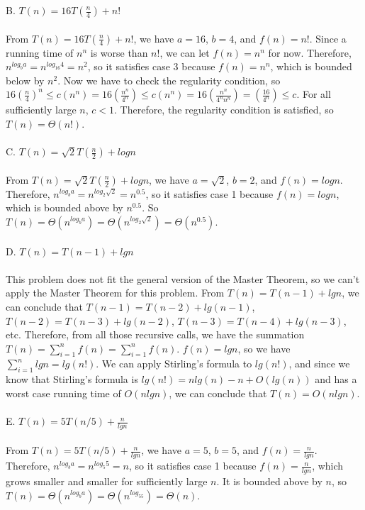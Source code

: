 \documentclass{article}
\begin{document}
\noindent B. $T(n) = 16 T(\frac{n}{4}) + n!$\\\\
From $T(n) = 16 T(\frac{n}{4}) + n!$, we have $a=16$, $b=4$, and $f(n)=n!$. Since a running time of $n^n$ is worse than $n!$, we can let $f(n)=n^n$ for now. Therefore, $n^{log_ba} = n^{log_{16}{4}} = n^2$, so it satisfies case 3 because $f(n) = n^n$, which is bounded below by $n^2$. Now we have to check the regularity condition, so $16 (\frac{n}{4})^n \leq c (n^{n}) = 16 (\frac{n^n}{4^n}) \leq c (n^{n}) = 16 (\frac{n^n}{4^nn^n}) = (\frac {16}{4^n}) \leq c$. For all sufficiently large $n$, $c < 1$. Therefore, the regularity condition is satisfied, so $T(n) = \Theta(n!)$.\\\\

\noindent C. $T(n) = \sqrt{2} T(\frac{n}{2}) + logn$\\\\
From $T(n) = \sqrt{2} T(\frac{n}{2}) + logn$, we have $a=\sqrt{2}$, $b=2$, and $f(n)=logn$. Therefore, $n^{log_ba} = n^{log_{2}{\sqrt{2}}} = n^{0.5}$, so it satisfies case 1 because $f(n) = logn$, which is bounded above by $n^{0.5}$. So $T(n) = \Theta(n^{log_ba}) = \Theta(n^{log_2\sqrt{2}}) = \Theta(n^{0.5})$.\\\\

\noindent D. $T(n) = T(n-1) + lgn$\\\\
This problem does not fit the general version of the Master Theorem, so we can't apply the Master Theorem for this problem. From $T(n) = T(n-1) + lgn$, we can conclude that $T(n-1) = T(n-2) + lg(n-1)$, $T(n-2) = T(n-3) + lg(n-2)$, $T(n-3) = T(n-4) + lg(n-3)$, etc. Therefore, from all those recursive calls, we have the summation $T(n) = \sum_{i=1}^{n}f(n) = \sum_{i=1}^{n}f(n)$. $f(n) = lgn$, so we have $\sum_{i=1}^{n}lgn = lg(n!)$. We can apply Stirling's formula to $lg(n!)$, and since we know that Stirling's formula is $lg(n!) = nlg(n) - n + O(lg(n))$ and has a worst case running time of $O(nlgn)$, we can conclude that $T(n) = O(nlgn)$. \\\\

\noindent E. $T(n) = 5T(n/5) + \frac{n}{lgn}$\\\\
From $T(n) = 5T(n/5) + \frac{n}{lgn}$, we have $a=5$, $b=5$, and $f(n)=\frac{n}{lgn}$. Therefore, $n^{log_ba} = n^{log_{5}{5}} = n$, so it satisfies case 1 because $f(n)=\frac{n}{lgn}$, which grows smaller and smaller for sufficiently large $n$. It is bounded above by $n$, so $T(n) = \Theta(n^{log_ba}) = \Theta(n^{log_55}) = \Theta(n)$.\\\\
\end{document}
